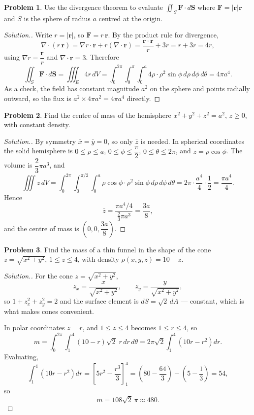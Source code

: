 \documentclass[11pt,a4paper]{article}
\theoremstyle{definition}
\newtheorem{problemx}{Problem}[subsection]
\newenvironment{problem}{\begin{problemx}}{\end{problemx}}
\newenvironment{solution}
  {\renewcommand{\qedsymbol}{}\begin{proof}[\textit{Solution}.]}
  {\end{proof}}
\begin{document}
\begin{problem}
Use the divergence theorem to evaluate
$\displaystyle{\iint_S\mathbf{F}\cdot d\textbf{S}}$ where
$\mathbf{F} = \left|\mathbf r\right|\mathbf r$ and $S$ is the sphere of
radius $a$ centred at the origin.
\end{problem}
\begin{solution}
Write $r = \left|\mathbf r\right|$, so $\mathbf{F} = r\,\mathbf r$. By the
product rule for divergence,
\[\nabla\cdot(r\,\mathbf r)
= \nabla r\cdot\mathbf r + r(\nabla\cdot\mathbf r)
= \frac{\mathbf r\cdot\mathbf r}{r} + 3r = r + 3r = 4r ,\]
using $\nabla r = \dfrac{\mathbf r}{r}$ and
$\nabla\cdot\mathbf r = 3$. Therefore
\[\iint_S\mathbf{F}\cdot d\textbf{S} = \iiint_E 4r\,dV
= \int_0^{2\pi}\int_0^{\pi}\int_0^a 4\rho\cdot\rho^2\sin\phi
\,d\rho\,d\phi\,d\theta = 4\pi a^4 .\]
As a check, the field has constant magnitude $a^2$ on the sphere and points
radially outward, so the flux is $a^2\times 4\pi a^2 = 4\pi a^4$ directly.
\end{solution}

\begin{problem}
Find the centre of mass of the hemisphere $x^2+y^2+z^2 = a^2$, $z\geq 0$, with
constant density.
\end{problem}
\begin{solution}
By symmetry $\bar x = \bar y = 0$, so only $\bar z$ is needed. In spherical
coordinates the solid hemisphere is
$0\leq\rho\leq a$, $0\leq\phi\leq\dfrac{\pi}{2}$,
$0\leq\theta\leq 2\pi$, and $z = \rho\cos\phi$. The volume is
$\dfrac23\pi a^3$, and
\[\iiint z\,dV
= \int_0^{2\pi}\int_0^{\pi/2}\int_0^a
\rho\cos\phi\cdot\rho^2\sin\phi\,d\rho\,d\phi\,d\theta
= 2\pi\cdot\frac{a^4}{4}\cdot\frac12 = \frac{\pi a^4}{4}.\]
Hence
\[\bar z = \frac{\pi a^4/4}{\frac23\pi a^3} = \frac{3a}{8},\]
and the centre of mass is $\left(0,0,\dfrac{3a}{8}\right)$.
\end{solution}

\begin{problem}
Find the mass of a thin funnel in the shape of the cone
$z = \sqrt{x^2+y^2}$, $1\leq z\leq 4$, with density
$\rho(x,y,z) = 10-z$.
\end{problem}
\begin{solution}
For the cone $z = \sqrt{x^2+y^2}$,
\[z_x = \frac{x}{\sqrt{x^2+y^2}},\qquad z_y = \frac{y}{\sqrt{x^2+y^2}},\]
so $1+z_x^2+z_y^2 = 2$ and the surface element is
$dS = \sqrt2\,dA$ --- constant, which is what makes cones convenient.

In polar coordinates $z = r$, and $1\leq z\leq 4$ becomes $1\leq r\leq 4$, so
\[m = \int_0^{2\pi}\int_1^4(10-r)\sqrt2\;r\,dr\,d\theta
= 2\pi\sqrt2\int_1^4(10r-r^2)dr .\]
Evaluating,
\[\int_1^4(10r-r^2)dr = \left[5r^2-\frac{r^3}{3}\right]_1^4
= \left(80-\frac{64}{3}\right) - \left(5-\frac13\right) = 54 ,\]
so
\[m = 108\sqrt2\,\pi \approx 480 .\]
\end{solution}
\end{document}
